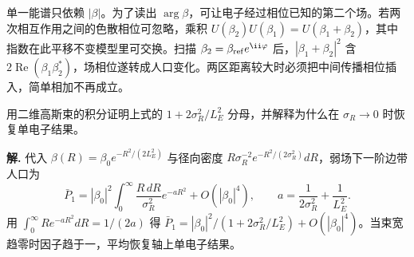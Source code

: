 单一能谱只依赖 \(|\beta|\)。为了读出 \(\arg\beta\)，可让电子经过相位已知的第二个场。若两次相互作用之间的色散相位可忽略，乘积 \(U(\beta_2)U(\beta_1)=U(\beta_1+\beta_2)\)，其中指数在此平移不变模型里可交换。扫描 \(\beta_2=\beta_{\rm ref}e^{\ii\varphi}\) 后，\(|\beta_1+\beta_2|^2\) 含 \(2\operatorname{Re}(\beta_1\beta_2^*)\)，场相位遂转成人口变化。两区距离较大时必须把中间传播相位插入，简单相加不再成立。



\par
\begin{workedexample}
用二维高斯束的积分证明上式的 \(1+2\sigma_R^2/L_E^2\) 分母，并解释为什么在 \(\sigma_R\to0\) 时恢复单电子结果。

\textbf{解.} 代入 \(\beta(R)=\beta_0e^{-R^2/(2L_E^2)}\) 与径向密度 \(R\sigma_R^{-2}e^{-R^2/(2\sigma_R^2)}dR\)，弱场下一阶边带人口为 \[ \bar P_1=|\beta_0|^2\int_0^\infty\frac{R\,dR}{\sigma_R^2}e^{-aR^2}+O(|\beta_0|^4),\qquad a=\frac1{2\sigma_R^2}+\frac1{L_E^2}. \] 用 \(\int_0^\infty Re^{-aR^2}dR=1/(2a)\) 得 \(\bar P_1=|\beta_0|^2/(1+2\sigma_R^2/L_E^2)+O(|\beta_0|^4)\)。当束宽趋零时因子趋于一，平均恢复轴上单电子结果。
\end{workedexample}
\par
